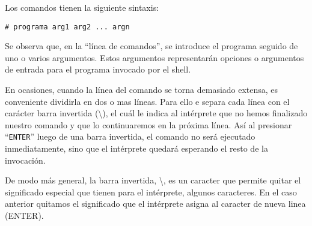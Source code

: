 \documentclass[12pt]{article}
\begin{document}
Los comandos tienen la siguiente sintaxis:

\texttt{\# programa arg1 arg2 ... argn}

Se observa que, en la ``línea de comandos'', se introduce el programa seguido de uno o varios argumentos. 
Estos argumentos representarán opciones o argumentos de entrada para el programa invocado por el shell. 



En ocasiones, cuando la línea del comando se torna demasiado extensa, es 
conveniente dividirla en dos o mas líneas. Para ello e separa cada línea 
con el carácter barra invertida (\textbackslash), el cuál le indica al 
intérprete que no hemos finalizado nuestro comando y que lo continuaremos 
en la próxima línea. Así al presionar ``\texttt{ENTER}'' luego de una 
barra invertida, el comando no será ejecutado inmediatamente, sino que el 
intérprete quedará esperando el resto de la invocación. 

De modo más general, la barra invertida, \textbackslash, es un caracter que
permite quitar el significado especial que tienen para el intérprete, 
algunos caracteres. En el caso anterior quitamos el significado que el 
intérprete asigna al caracter de nueva linea (ENTER).
\end{document}
